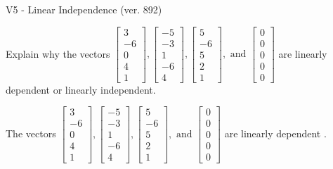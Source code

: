 \begin{exercise}
  \begin{exerciseTitle}V5 - Linear Independence (ver. 892)\end{exerciseTitle}
  \begin{exerciseStatement}
    Explain why the vectors \(\left[\begin{array}{r}
3 \\
-6 \\
0 \\
4 \\
1
\end{array}\right] , \left[\begin{array}{r}
-5 \\
-3 \\
1 \\
-6 \\
4
\end{array}\right] , \left[\begin{array}{r}
5 \\
-6 \\
5 \\
2 \\
1
\end{array}\right] , \text{ and } \left[\begin{array}{r}
0 \\
0 \\
0 \\
0 \\
0
\end{array}\right]\) are linearly dependent or linearly independent.	


  \end{exerciseStatement}
  \begin{exerciseAnswer}
   The vectors \(\left[\begin{array}{r}
3 \\
-6 \\
0 \\
4 \\
1
\end{array}\right] , \left[\begin{array}{r}
-5 \\
-3 \\
1 \\
-6 \\
4
\end{array}\right] , \left[\begin{array}{r}
5 \\
-6 \\
5 \\
2 \\
1
\end{array}\right] , \text{ and } \left[\begin{array}{r}
0 \\
0 \\
0 \\
0 \\
0
\end{array}\right]\) are 
  	 linearly dependent  .
  


  \end{exerciseAnswer}
\end{exercise}